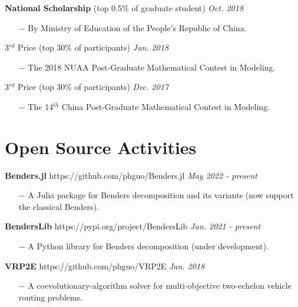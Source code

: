 \documentclass[margin]{res}
\begin{document}
\begin{resume}
{\bf National Scholarship} (top 0.5\% of graduate student) \hfill {\it Oct. 2018}
\begin{itemize} \itemsep -2pt  %
\item[\(-\)] By Ministry of Education of the People's Republic of China.
\end{itemize}
\vspace{-.8em}

{3\(^{rd}\) Price} (top 30\% of participants)  \hfill {\it Jun. 2018} 
\begin{itemize} \itemsep -2pt  %
\item[\(-\)] The 2018 NUAA Post-Graduate Mathematical Contest in Modeling.
\end{itemize}
\vspace{-.8em}

{3\(^{rd}\) Price} (top 30\% of participants)  \hfill {\it Dec. 2017}
\begin{itemize} \itemsep -2pt  %
\item[\(-\)] The 14\(^{th}\) China Post-Graduate Mathematical Contest in Modeling.
\end{itemize}


\vspace{-.8em}
\section{\sc Open Source Activities} 


\textbf{Benders.jl } https://github.com/phguo/Benders.jl \hfill {\it May 2022 - present}
\begin{itemize} \itemsep -2pt
\item[\(-\)] A Julia package for Benders decomposition and its variants (now support the classical Benders).
\end{itemize}
\vspace{-.8em}

\textbf{BendersLib } https://pypi.org/project/BendersLib \hfill {\it Jun. 2021 - present}
\begin{itemize} \itemsep -2pt
\item[\(-\)] A Python library for Benders decomposition (under development).
\end{itemize}
\vspace{-.8em}

\textbf{VRP2E } https://github.com/phguo/VRP2E \hfill {\it Jan. 2018}
\begin{itemize} \itemsep -2pt
\item[\(-\)] A coevolutionary-algorithm solver for multi-objective two-echelon vehicle routing problems.
\end{itemize}
\vspace{-.8em}


\end{resume}
\end{document}
